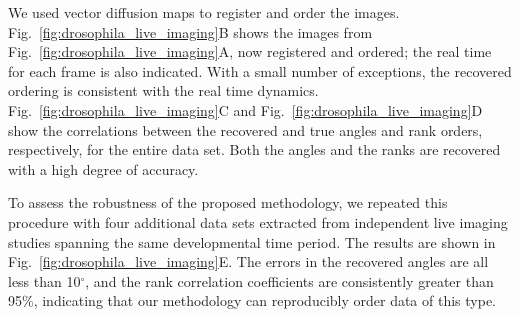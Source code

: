 \documentclass[twocolumn, 10pt]{article}
\newcommand{\fig}[0]{Fig.}
\begin{document}
We used vector diffusion maps to register and order the images.
%
\fig~\ref{fig:drosophila_live_imaging}B shows the images from \fig~\ref{fig:drosophila_live_imaging}A, now registered and ordered; the real time for each frame is also indicated.
%
With a small number of exceptions, the recovered ordering is consistent with the real time dynamics.
%
\fig~\ref{fig:drosophila_live_imaging}C and \fig~\ref{fig:drosophila_live_imaging}D  show the correlations between the recovered and true angles and rank orders, respectively, for the entire data set.
%
Both the angles and the ranks are recovered with a high degree of accuracy.

To assess the robustness of the proposed methodology, we repeated this procedure with four additional data sets extracted from independent live imaging studies spanning the same developmental time period.
%
The results are shown in \fig~\ref{fig:drosophila_live_imaging}E.
%
The errors in the recovered angles are all less than 10$^\circ$, and the rank correlation coefficients are consistently greater than 95\%, indicating that our methodology can reproducibly order data of this type.
%
%
%
%
\end{document}

